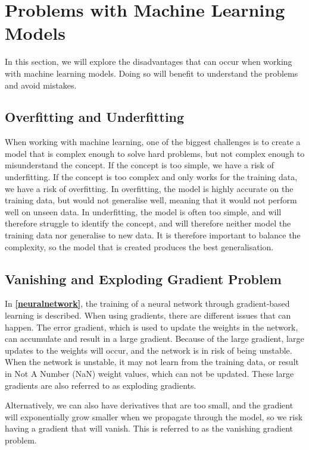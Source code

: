 \section{Problems with Machine Learning Models} \label{sec:problemsmachinelearning}
In this section, we will explore the disadvantages that can occur when working with machine learning models. Doing so will benefit to understand the problems and avoid mistakes.  

\subsection{Overfitting and Underfitting}\label{sec:over_underfit}

When working with machine learning, one of the biggest challenges is to create a model that is complex enough to solve hard problems, but not complex enough to misunderstand the concept. If the concept is too simple, we have a risk of underfitting. If the concept is too complex and only works for the training data, we have a risk of overfitting. In overfitting, the model is highly accurate on the training data, but would not generalise well, meaning that it would not perform well on unseen data. In underfitting, the model is often too simple, and will therefore struggle to identify the concept, and will therefore neither model the training data nor generalise to new data. It is therefore important to balance the complexity, so the model that is created produces the best generalisation.\cite{Hulten2018}

\subsection{Vanishing and Exploding Gradient Problem} \label{sec:vanishing_exploding_gradient_problem}

In \textbf{\autoref{neuralnetwork}}, the training of a neural network through gradient-based learning is described. When using gradients, there are different issues that can happen. The error gradient, which is used to update the weights in the network, can accumulate and result in a large gradient. Because of the large gradient, large updates to the weights will occur, and the network is in risk of being unstable. When the network is unstable, it may not learn from the training data, or result in Not A Number (NaN) weight values, which can not be updated. These large gradients are also referred to as exploding gradients.\cite{vanishingexploding}

Alternatively, we can also have derivatives that are too small, and the gradient will exponentially grow smaller when we propagate through the model, so we risk having a gradient that will vanish. This is referred to as the vanishing gradient problem.\cite{vanishingexploding}